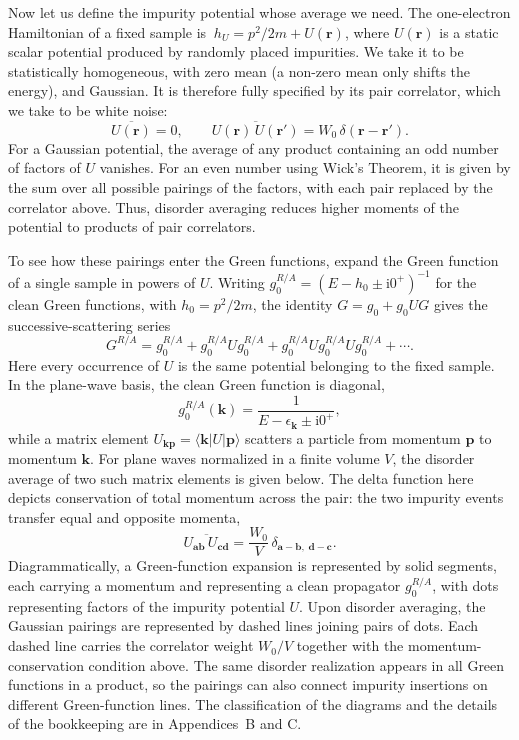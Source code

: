 Now let us define the impurity potential whose average we need. The one-electron Hamiltonian of a fixed sample is $~h_U=p^2/2m+U(\mathbf r)$, where $U(\mathbf r)$ is a static scalar potential produced by randomly placed impurities. We take it to be statistically homogeneous, with zero mean (a non-zero mean only shifts the energy), and Gaussian. It is therefore fully specified by its pair correlator, which we take to be white noise:
\[
\overline{U(\mathbf r)}=0,\qquad
\overline{U(\mathbf r)\,U(\mathbf r')}=W_0\,\delta(\mathbf r-\mathbf r').
\]
For a Gaussian potential, the average of any product containing an odd number of factors of $U$ vanishes. For an even number using Wick's Theorem, it is given by the sum over all possible pairings of the factors, with each pair replaced by the correlator above. Thus, disorder averaging reduces higher moments of the potential to products of pair correlators.

To see how these pairings enter the Green functions, expand the Green function of a single sample in powers of $U$. Writing $g_0^{R/A}=(E-h_0\pm\mathrm{i}0^+)^{-1}$ for the clean Green functions, with $h_0=p^2/2m$, the identity $G=g_0+g_0UG$ gives the successive-scattering series
\[
G^{R/A}=g_0^{R/A}+g_0^{R/A}Ug_0^{R/A}
+g_0^{R/A}Ug_0^{R/A}Ug_0^{R/A}+\cdots .
\]
Here every occurrence of $U$ is the same potential belonging to the fixed sample. In the plane-wave basis, the clean Green function is diagonal,
\[
g_0^{R/A}(\mathbf k)
=\frac{1}{E-\epsilon_{\mathbf k}\pm\mathrm{i}0^+},
\]
while a matrix element $U_{\mathbf k\mathbf p}=\langle\mathbf k|U|\mathbf p\rangle$ scatters a particle from momentum $\mathbf p$ to momentum $\mathbf k$. For plane waves normalized in a finite volume $V$, the disorder average of two such matrix elements is given below. The delta function here depicts conservation of total momentum across the pair: the two impurity events transfer equal and opposite momenta,
\[
\overline{U_{\mathbf a\mathbf b}\,U_{\mathbf c\mathbf d}}
=\frac{W_0}{V}\,
\delta_{\mathbf a-\mathbf b,\;\mathbf d-\mathbf c}.
\]
Diagrammatically, a Green-function expansion is represented by solid segments, each carrying a momentum and representing a clean propagator $g_0^{R/A}$, with dots representing factors of the impurity potential $U$. Upon disorder averaging, the Gaussian pairings are represented by dashed lines joining pairs of dots. Each dashed line carries the correlator weight $W_0/V$ together with the momentum-conservation condition above. The same disorder realization appears in all Green functions in a product, so the pairings can also connect impurity insertions on different Green-function lines. The classification of the diagrams and the details of the bookkeeping are in Appendices~B and C.

